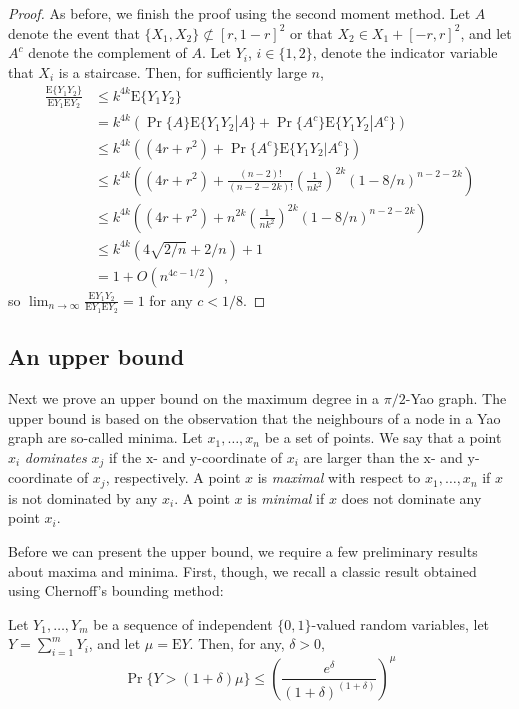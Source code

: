 \documentclass[lotsofwhite,charterfonts]{patmorin}
\newcommand{\PROB}{\Pr}
\newcommand{\EXP}{\mathrm{E}}
\begin{document}
\begin{proof}
As before, we finish the proof using the second moment method.  Let $A$
denote the event that $\{X_1,X_2\}\not\subset[r,1-r]^2$ or that $X_2\in
X_1+[-r,r]^2$, and let $A^c$ denote the complement of $A$.  Let $Y_i$,
$i\in\{1,2\}$, denote the indicator variable that $X_i$ is a staircase.
Then, for sufficiently large $n$,
\[
  \begin{aligned}
    \frac{\EXP\{Y_1Y_2\}}{\EXP{Y_1}\EXP{Y_2}}
      & \le k^{4k} \EXP\{Y_1Y_2\} \\
      & = k^{4k} (\PROB\{A\}\EXP\{Y_1Y_2|{A}\} 
             +\PROB\{A^c\}\EXP\{Y_1Y_2|A^c\}) \\
      & \le k^{4k} ((4r+r^2) + \Pr\{A^c\}\EXP\{Y_1Y_2|A^c\}) \\
      & \le k^{4k} \left((4r+r^2) + \frac{(n-2)!}{(n-2-2k)!}\left(\frac{1}{nk^2}\right)^{2k}(1-8/n)^{n-2-2k}\right) \\
      & \le k^{4k} \left((4r+r^2) + n^{2k}\left(\frac{1}{nk^2}\right)^{2k}(1-8/n)^{n-2-2k}\right) \\
      & \le k^{4k}\left(4\sqrt{2/n}+ 2/n\right) + 1  \\
      & = 1 + O(n^{4c-1/2}) \enspace ,
  \end{aligned}
\]
so $\lim_{n\rightarrow\infty} \frac{\EXP{Y_1Y_2}}{\EXP{Y_1}\EXP{Y_2}} = 1$
for any $c<1/8$.
\end{proof}

\subsection{An upper bound}

Next we prove an upper bound on the maximum degree in a $\pi/2$-Yao graph.
The upper bound is based on the observation that the neighbours of a node
in a Yao graph are so-called minima.  Let $x_1,\ldots,x_n$ be a set of
points. We say that a point $x_i$ \emph{dominates} $x_j$ if the
$\mathrm{x}$- and $\mathrm{y}$-coordinate of $x_i$ are larger than the
$\mathrm{x}$- and $\mathrm{y}$-coordinate of $x_j$, respectively.  A point
$x$ is \emph{maximal} with respect to $x_1,\ldots,x_n$ if $x$ is not
dominated by any $x_i$.  A point $x$ is \emph{minimal} if $x$ does not
dominate any point $x_i$.

Before we can present the upper bound, we require a few preliminary results
about maxima and minima.  First, though, we recall a classic result 
obtained using Chernoff's bounding method:

\begin{lem}
Let $Y_1,\ldots,Y_m$ be a sequence of independent $\{0,1\}$-valued
random variables, let $Y=\sum_{i=1}^m Y_i$, and let $\mu=\EXP{Y}$.
Then, for any, $\delta > 0$,
\[
   \Pr\{Y > (1+\delta)\mu\} 
     \le \left(\frac{e^{\delta}}{(1+\delta)^{(1+\delta)}}\right)^{\mu}
\]
\end{lem}
\end{document}
